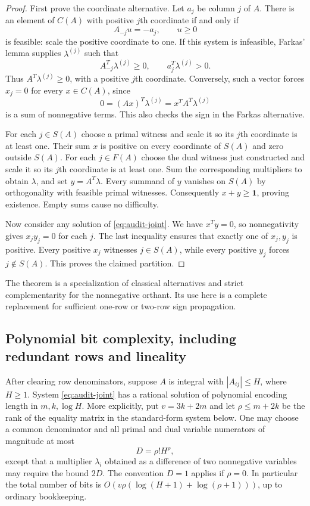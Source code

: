 \begin{proof}
First prove the coordinate alternative.  Let $a_j$ be column $j$ of
$A$.  There is an element of $C(A)$ with positive $j$th coordinate if
and only if
\[
 A_{-j}u=-a_j,\qquad u\geq0
\]
is feasible: scale the positive coordinate to one.  If this system is
infeasible, Farkas' lemma supplies $\lambda^{(j)}$ such that
\[
 A_{-j}^T\lambda^{(j)}\geq0,
 \qquad a_j^T\lambda^{(j)}>0.
\]
Thus $A^T\lambda^{(j)}\geq0$, with a positive $j$th coordinate.
Conversely, such a vector forces $x_j=0$ for every $x\in C(A)$, since
\[
 0=(Ax)^T\lambda^{(j)}=x^TA^T\lambda^{(j)}
\]
is a sum of nonnegative terms.  This also checks the sign in the Farkas
alternative.

For each $j\in S(A)$ choose a primal witness and scale it so its $j$th
coordinate is at least one.  Their sum $x$ is positive on every
coordinate of $S(A)$ and zero outside $S(A)$.  For each $j\in F(A)$
choose the dual witness just constructed and scale it so its $j$th
coordinate is at least one.  Sum the corresponding multipliers to obtain
$\lambda$, and set $y=A^T\lambda$.  Every summand of $y$ vanishes on
$S(A)$ by orthogonality with feasible primal witnesses.  Consequently
$x+y\geq\mathbf1$, proving existence.  Empty sums cause no difficulty.

Now consider any solution of \eqref{eq:audit-joint}.  We have
$x^Ty=0$, so nonnegativity gives $x_jy_j=0$ for each $j$.
The last inequality ensures that exactly one of $x_j,y_j$ is positive.
Every positive $x_j$ witnesses $j\in S(A)$, while every positive $y_j$
forces $j\notin S(A)$.  This proves the claimed partition.
\end{proof}

The theorem is a specialization of classical alternatives and strict
complementarity for the nonnegative orthant.  Its use here is a complete
replacement for sufficient one-row or two-row sign propagation.

\subsection{Polynomial bit complexity, including redundant rows and lineality}

\begin{proposition}
After clearing row denominators, suppose $A$ is integral with
$|A_{ij}|\leq H$, where $H\geq1$.  System
\eqref{eq:audit-joint} has a rational solution of polynomial encoding
length in $m,k,\log H$.  More explicitly, put $v=3k+2m$ and let
$\rho\leq m+2k$ be the rank of the equality matrix in the standard-form
system below.  One may choose a common denominator and all primal and
dual variable numerators of magnitude at most
\[
 D=\rho!H^\rho,
\]
except that a multiplier $\lambda_i$ obtained as a difference of two
nonnegative variables may require the bound $2D$.  The convention
$D=1$ applies if $\rho=0$.  In particular the total number of bits is
$O(v\rho(\log(H+1)+\log(\rho+1)))$, up to ordinary bookkeeping.
\end{proposition}

